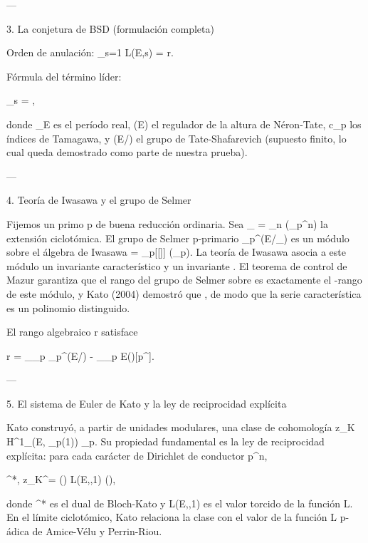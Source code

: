 \documentclass[12pt,twoside]{book}
\begin{document}
---

3. La conjetura de BSD (formulación completa)

Orden de anulación: _{s=1} L(E,s) = r.

Fórmula del término líder:

\lim_{s}  = ,

donde \Omega_E es el período real, (E) el regulador de la altura de Néron-Tate, c_p los índices de Tamagawa, y (E/) el grupo de Tate-Shafarevich (supuesto finito, lo cual queda demostrado como parte de nuestra prueba).

---

4. Teoría de Iwasawa y el grupo de Selmer

Fijemos un primo p de buena reducción ordinaria. Sea _{\infty} = \bigcup_{n} (\mu_{p^n}) la extensión ciclotómica. El grupo de Selmer p-primario _{p^\infty}(E/_{\infty}) es un módulo sobre el álgebra de Iwasawa \Lambda = _p[[\Gamma]] (\Gamma \cong {}_p). La teoría de Iwasawa asocia a este módulo un invariante característico \lambda y un invariante \mu. El teorema de control de Mazur garantiza que el rango del grupo de Selmer sobre  es exactamente el \Lambda-rango de este módulo, y Kato (2004) demostró que , de modo que la serie característica es un polinomio distinguido.

El rango algebraico r satisface

r = _{_p} _{p^\infty}(E/) - \dim_{_p} E()[p^\infty].

---

5. El sistema de Euler de Kato y la ley de reciprocidad explícita

Kato construyó, a partir de unidades modulares, una clase de cohomología z_K \in H^1_{}(E, _p(1)) \otimes {}_p. Su propiedad fundamental es la ley de reciprocidad explícita: para cada carácter de Dirichlet \chi de conductor p^n,

\langle \exp^*, z_K^\chi \rangle = \tau(\chi) \cdot L(E,\chi,1) \cdot (),

donde \exp^* es el dual de Bloch-Kato y L(E,\chi,1) es el valor torcido de la función L. En el límite ciclotómico, Kato relaciona la clase con el valor de la función L p-ádica de Amice-Vélu y Perrin-Riou.
\end{document}
